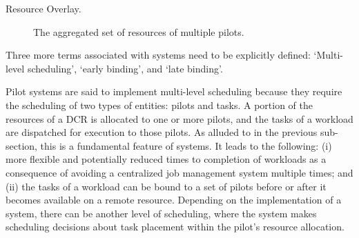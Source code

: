 \documentclass{sig-alternate}
\begin{document}

\begin{description}
\item[Resource Overlay.] The aggregated set of resources of multiple pilots.
\end{description}

Three more terms associated with \pilot systems need to be explicitly defined:
`Multi-level scheduling', `early binding', and `late binding'.


 

Pilot systems are said to implement multi-level scheduling because they require
the scheduling of two types of entities: pilots and tasks. A portion of the
resources of a DCR is allocated to one or more pilots, and the tasks of a
workload are dispatched for execution to those pilots. As alluded to in the
previous sub-section, this is a fundamental feature of \pilot systems.  It leads
to the following: (i) more flexible and potentially reduced times to completion
of workloads as a consequence of avoiding a centralized job management system
multiple times; and (ii) the tasks of a workload can be bound to a set of pilots
before or after it becomes available on a remote resource. Depending on the
implementation of a \pilot system, there can be another level of scheduling,
where the \pilot system makes scheduling decisions about task placement within
the pilot's resource allocation.


\end{document}
